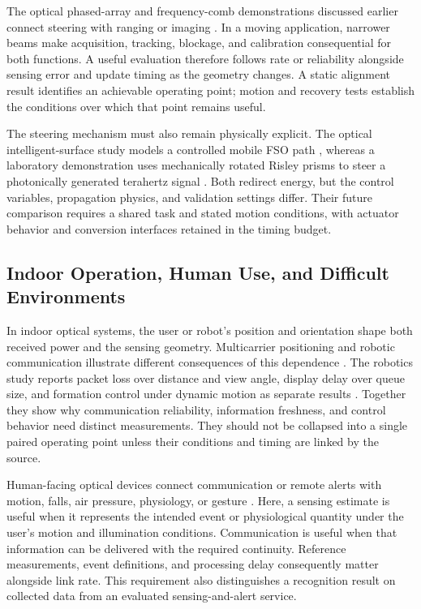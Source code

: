 The optical phased-array and frequency-comb demonstrations discussed earlier
connect steering with ranging or imaging
\cite{OISAC_SCR00941,OISAC_SCR00362}. In a moving application, narrower beams
make acquisition, tracking, blockage, and calibration consequential for both
functions. A useful evaluation therefore follows rate or reliability alongside
sensing error and update timing as the geometry changes. A static alignment
result identifies an achievable operating point; motion and recovery tests
establish the conditions over which that point remains useful.

The steering mechanism must also remain physically explicit. The optical
intelligent-surface study models a controlled mobile FSO path
\cite{OISAC_SCR00914}, whereas a laboratory demonstration uses mechanically
rotated Risley prisms to steer a photonically generated terahertz signal
\cite{OISAC_SCR00953}. Both redirect energy, but the control variables,
propagation physics, and validation settings differ. Their future comparison
requires a shared task and stated motion conditions, with actuator behavior
and conversion interfaces retained in the timing budget.

\subsection{Indoor Operation, Human Use, and Difficult Environments}

In indoor optical systems, the user or robot's position and orientation shape
both received power and the sensing geometry. Multicarrier positioning and
robotic communication illustrate different consequences of this dependence
\cite{OISAC_SCR01024,OISAC_SCR00910}. The robotics study reports packet loss over
distance and view angle, display delay over queue size, and formation control
under dynamic motion as separate results \cite{OISAC_SCR00910}. Together they
show why communication reliability, information freshness, and control behavior
need distinct measurements. They should not be collapsed into a single paired
operating point unless their conditions and timing are linked by the source.

Human-facing optical devices connect communication or remote alerts with
motion, falls, air pressure, physiology, or gesture
\cite{OISAC_SCR00451,OISAC_SCR00294,OISAC_SCR00376}. Here, a sensing estimate is
useful when it represents the intended event or physiological quantity under
the user's motion and illumination conditions. Communication is useful when
that information can be delivered with the required continuity. Reference
measurements, event definitions, and processing delay consequently matter
alongside link rate. This requirement also distinguishes a recognition result
on collected data from an evaluated sensing-and-alert service.

